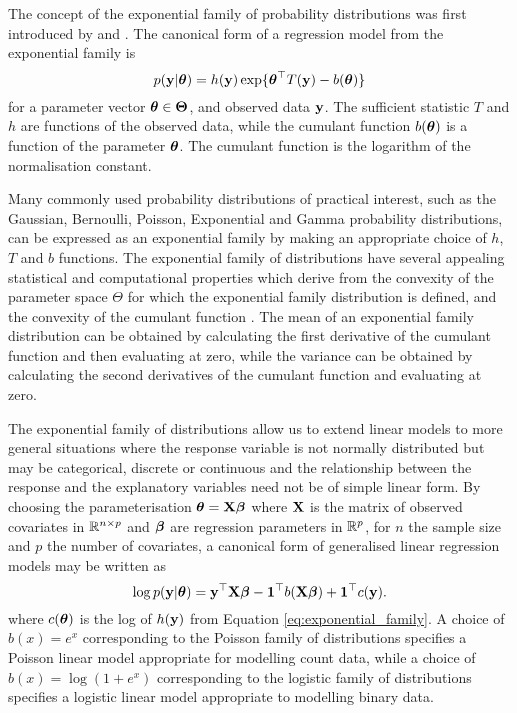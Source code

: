 The concept of the exponential family of probability distributions was first introduced by \cite{Koopman1935}
and \cite{pitman_1936}. The canonical form of a regression model from the exponential family is
\begin{equation}\label{eq:exponential_family}
	p({\bf y} | {\boldsymbol \theta}) = h({\bf y}) \exp \{ {\boldsymbol \theta}^\top T({\bf y}) - b({\boldsymbol \theta}) \}
\end{equation}
for a parameter vector ${\boldsymbol \theta} \in \mathbf{\Theta}$, and observed data ${\bf y}$. The sufficient statistic $T$
and $h$ are functions of the observed data, while the cumulant function $b({\boldsymbol \theta})$ is a function of the
parameter ${\boldsymbol \theta}$. The cumulant function is the logarithm of the normalisation constant.

Many commonly used probability distributions of practical interest, such as the Gaussian, Bernoulli, Poisson,
Exponential and Gamma probability distributions, can be expressed as an exponential family by making an
appropriate choice of $h$, $T$ and $b$ functions. The exponential family of distributions have several
appealing statistical and computational properties which derive from the convexity of the parameter space
$\Theta$ for which the exponential family distribution is defined, and the convexity of the cumulant function
\cite{Jordan2010}. The mean of an exponential family distribution can be obtained by calculating
the first derivative of the cumulant function and then evaluating at zero, while the variance can be obtained
by calculating the second derivatives of the cumulant function and evaluating at zero.

The exponential family of distributions allow us to extend linear models to more general situations where the
response variable is not normally distributed but may be categorical, discrete or continuous and the
relationship between the response and the explanatory variables need not be of simple linear form.  By
choosing the parameterisation ${\boldsymbol \theta} = {\bf X} {\boldsymbol \beta}$ where ${\bf X}$ is the matrix of observed covariates in
${\mathbb{R}}^{n \times p}$ and ${\boldsymbol \beta}$ are regression parameters in ${\mathbb{R}}^p$, for $n$ the sample size and $p$ the number
of covariates, a canonical form of generalised linear regression models may be written as
\begin{equation}\label{eq:glm}
	\log p({\bf y} | {\boldsymbol \theta}) = {\bf y}^\top {\bf X} {\boldsymbol\beta} - {\bf 1}^\top b({\bf X} {\boldsymbol \beta}) + {\bf 1}^\top c({\bf y}).
\end{equation}
where $c({\boldsymbol \theta})$ is the log of $h({\bf y})$ from Equation \ref{eq:exponential_family}. A choice of $b(x) = e^x$
corresponding to the Poisson family of distributions specifies a Poisson linear model appropriate for
modelling count data, while a choice of $b(x) = \log(1 + e^x)$ corresponding to the logistic family of
distributions specifies a logistic linear model appropriate to modelling binary data.

